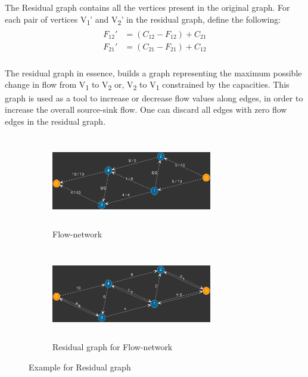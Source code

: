 \documentclass[paper=a4, fontsize=11pt]{scrartcl} %
\numberwithin{equation}{section} %
\numberwithin{figure}{section} %
\numberwithin{table}{section} %
\begin{document}
The Residual graph contains all the vertices present in the original graph. For each pair of vertices V\textsubscript{1}' and V\textsubscript{2}' in the residual graph, define the following:
\begin{align}
\begin{split}
F_{12}' &= (C_{12} - F_{12} ) + C_{21}\\
F_{21}' &= (C_{21} - F_{21} ) + C_{12}\\
\end{split}
\end{align}

The residual graph in essence, builds a graph representing the maximum possible change in flow from V\textsubscript{1} to V\textsubscript{2} or, V\textsubscript{2} to V\textsubscript{1} constrained by the capacities. This graph is used as a tool to increase or decrease flow values along edges, in order to increase the overall source-sink flow. One can discard all edges with zero flow edges in the residual graph.

\begin{figure}[h]
\begin{subfigure}{0.5\textwidth}
\includegraphics[width=7cm, height=4cm,center]{p6.png}
\caption{Flow-network}
\label{fig:subim1}
\end{subfigure}
\begin{subfigure}{0.5\textwidth}
\includegraphics[width=7cm, height=4cm,center]{p5.png}
\caption{Residual graph for Flow-network}
\label{fig:subim2}
\end{subfigure}

\caption{Example for Residual graph}
\label{fig:image2}
\end{figure}
\end{document}

